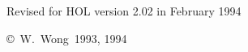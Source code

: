 \vspace{20pt}
\begin{center}
Revised for HOL version 2.02 in February 1994
\end{center}
\vfill
\begin{center}
\copyright\ W.\ Wong\ 1993, 1994
\end{center}
\newpage
